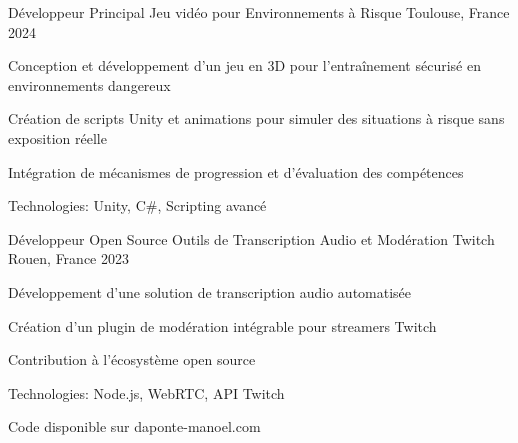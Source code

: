 


\begin{cventries}


\cventry
{Développeur Principal} %
{Jeu vidéo pour Environnements à Risque} %
{Toulouse, France} %
{2024} %
{ %
\begin{cvitems}
\item {Conception et développement d'un jeu en 3D pour l'entraînement sécurisé en environnements dangereux}
\item {Création de scripts Unity et animations pour simuler des situations à risque sans exposition réelle}
\item {Intégration de mécanismes de progression et d'évaluation des compétences}
\item {Technologies: Unity, C\#, Scripting avancé}
\end{cvitems}
}
\vspace{1.5em}


\cventry
{Développeur Open Source} %
{Outils de Transcription Audio et Modération Twitch} %
{Rouen, France} %
{2023} %
{ %
\begin{cvitems}
\item {Développement d'une solution de transcription audio automatisée}
\item {Création d'un plugin de modération intégrable pour streamers Twitch}
\item {Contribution à l'écosystème open source}
\item {Technologies: Node.js, WebRTC, API Twitch}
\item {Code disponible sur daponte-manoel.com}
\end{cvitems}
}
\vspace{1.5em}



\end{cventries}
